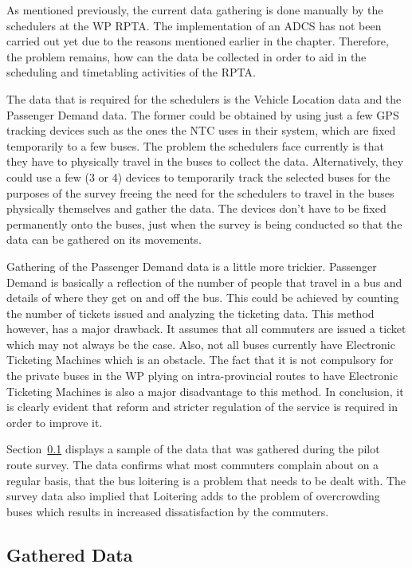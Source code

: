 As mentioned previously, the current data gathering is done manually by the schedulers at the WP RPTA. The implementation of an ADCS has not been carried out yet due to the reasons mentioned earlier in the chapter. Therefore, the problem remains, how can the data be collected in order to aid in the scheduling and timetabling activities of the RPTA.

The data that is required for the schedulers is the Vehicle Location data and the Passenger Demand data. The former could be obtained by using just a few GPS tracking devices such as the ones the NTC uses in their system, which are fixed temporarily to a few buses. The problem the schedulers face currently is that they have to physically travel in the buses to collect the data. Alternatively, they could use a few (3 or 4) devices to temporarily track the selected buses for the purposes of the survey freeing the need for the schedulers to travel in the buses physically themselves and gather the data. The devices don't have to be fixed permanently onto the buses, just when the survey is being conducted so that the data can be gathered on its movements.

Gathering of the Passenger Demand data is a little more trickier. Passenger Demand is basically a reflection of the number of people that travel in a bus and details of where they get on and off the bus. This could be achieved by counting the number of tickets issued and analyzing the ticketing data. This method however, has a major drawback. It assumes that all commuters are issued a ticket which may not always be the case. Also, not all buses currently have Electronic Ticketing Machines which is an obstacle. The fact that it is not compulsory for the private buses in the WP plying on intra-provincial routes to have Electronic Ticketing Machines is also a major disadvantage to this method. In conclusion, it is clearly evident that reform and stricter regulation of the service is required in order to improve it.

Section~\ref{GatheredData} displays a sample of the data that was gathered during the pilot route survey. The data confirms what most commuters complain about on a regular basis, that the bus loitering is a problem that needs to be dealt with. The survey data also implied that Loitering adds to the problem of overcrowding buses which results in increased dissatisfaction by the commuters.

\subsection {Gathered Data}
\label {GatheredData}

